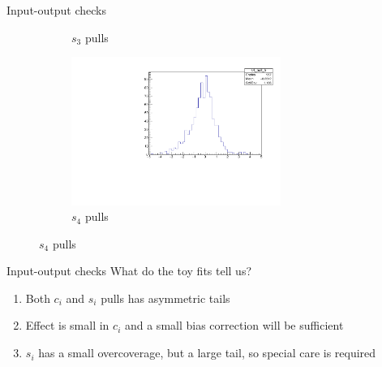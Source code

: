 \documentclass{beamer}
\begin{document}
\begin{frame}{Input-output checks}
\begin{figure}
\begin{subfigure}{0.5\textwidth}
      \caption{$s_3$ pulls}
    \end{subfigure}%
    \begin{subfigure}{0.5\textwidth}
      \centering
      \includegraphics[width=0.75\textwidth]{Plots/s4_ToyFits_pull.pdf}
      \caption{$s_4$ pulls}
    \end{subfigure}
  \end{figure}
\end{frame}

\begin{frame}{Input-output checks}
  \vspace{0.0cm}
  {\Large What do the toy fits tell us?}
  \vspace{1.0cm}
  \begin{enumerate}
    \setlength\itemsep{2.0em}
    \item{Both $c_i$ and $s_i$ pulls has asymmetric tails}
    \item{Effect is small in $c_i$ and a small bias correction will be sufficient}
    \item{$s_i$ has a small overcoverage, but a large tail, so special care is required}
  \end{enumerate}
\end{frame}
\end{document}
